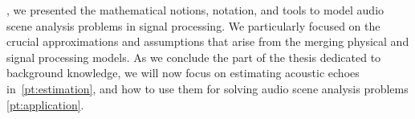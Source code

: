 
, we presented the mathematical notions, notation, and tools to model audio scene analysis problems in signal processing.
We particularly focused on the crucial approximations and assumptions that arise from the merging physical and signal processing models.
As we conclude the part of the thesis dedicated to background knowledge, we will now focus on estimating acoustic echoes in~\cref{pt:estimation}, and how to use them for solving audio scene analysis problems \cref{pt:application}.
